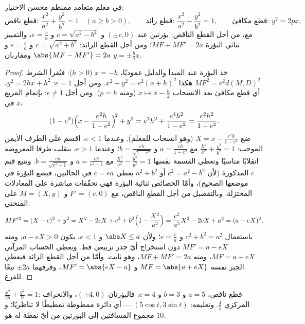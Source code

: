 \begin{theorem}\label{thm:b1:curves:reduced}
في معلم متعامد ممنظم محسن الاختيار:
\[
\text{قطع ناقص: } \frac{x^2}{a^2} + \frac{y^2}{b^2} = 1
\quad (a \geq b > 0),
\qquad
\text{قطع زائد: } \frac{x^2}{a^2} - \frac{y^2}{b^2} = 1,
\qquad
\text{قطع مكافئ: } y^2 = 2px,
\]
مع، من أجل القطع الناقص: بؤرتين عند $(\pm c, 0)$ و $c = \sqrt{a^2 - b^2}$ و
$e = \frac ca$، والتمييز ثنائي البؤرة $MF + MF' = 2a$؛
ومن أجل القطع الزائد: $c = \sqrt{a^2 + b^2}$ و $e = \frac ca$ و
$\abs{MF - MF'} = 2a$ ومقاربان $y = \pm\frac ba x$.
\end{theorem}

\begin{proof}
خذ البؤرة عند المبدأ والدليل عموديًا، $x = -h$
($h > 0$): فيُقرأ الشرط $MF^2 = e^2 d(M, D)^2$ هكذا $x^2 + y^2 =
e^2 (x + h)^2$. ومن أجل $e = 1$: $y^2 = 2hx + h^2$، أي قطع مكافئ بعد
الانسحاب $x \mapsto x - \frac h2$ (ومنه $p = h$). ومن أجل $e \neq 1$:
بإتمام المربع في $x$،
\[
(1 - e^2)\Bigl(x - \frac{e^2 h}{1 - e^2}\Bigr)^{\!2} + y^2
= e^2h^2 + \frac{e^4 h^2}{1 - e^2}
= \frac{e^2 h^2}{1 - e^2} .
\]
ضع $X = x - \frac{e^2h}{1-e^2}$ (وهو انسحاب للمعلم). وعندما $e < 1$،
اقسم على الطرف الأيمن الموجب:
$\frac{X^2}{a^2} + \frac{y^2}{b^2} = 1$ مع $a = \frac{eh}{1 -
e^2}$ و $b = \frac{eh}{\sqrt{1-e^2}}$؛ وعندما $e > 1$، ينقلب طرفا
المعروضة انقلابًا مناسبًا وتعطي القسمة نفسها
$\frac{X^2}{a^2} - \frac{y^2}{b^2} = 1$ مع $a = \frac{eh}{e^2 -
1}$ و $b = \frac{eh}{\sqrt{e^2 - 1}}$. وتتبع قيم $c$ المذكورة
(لأن $c^2 = a^2 - b^2$ أو $a^2 + b^2$ يعطي $c = ea$ في
الحالتين، فيضع البؤرة في موضعها الصحيح)، وأمّا الخصائص ثنائية البؤرة فهي
تحقّقات مباشرة على المعادلات المختزلة. وبالتفصيل من أجل
القطع الناقص، مع $F' = (c, 0)$ و $M = (X, y)$ على المنحني:
\[
MF'^2 = (X - c)^2 + y^2
= X^2 - 2cX + c^2 + b^2\Bigl(1 - \frac{X^2}{a^2}\Bigr)
= \frac{c^2}{a^2}X^2 - 2cX + a^2
= (a - eX)^2 ,
\]
باستعمال $c^2 + b^2 = a^2$ و $e = \frac ca$؛ ولأن $\abs X \leq
a$ و $e < 1$، يكون $a - eX > 0$، ومنه $MF' = a - eX$ دون استخراج أيّ جذر
تربيعي قط. ويعطي الحساب المرآتي $MF = a + eX$،
ومنه $MF + MF' = 2a$، وهو ثابت. وأمّا من أجل القطع الزائد فيعطي الجبر
نفسه $MF = \abs{a + eX}$ و $MF' = \abs{eX - a}$،
وفرقهما $\pm2a$ تبعًا للفرع.
\end{proof}

\begin{example}\label{ex:b1:curves:conicexample}
$\frac{x^2}{25} + \frac{y^2}{9} = 1$: قطع ناقص، $a = 5$ و $b = 3$ و $c
= 4$: فالبؤرتان $(\pm4, 0)$، والانحراف المركزي $\frac45$. وتعليمه:
$(5\cos t, 3\sin t)$ --- أي دائرة ممطوطة تمطيطًا لا تناظريًا؛ و
مجموع المسافتين إلى البؤرتين من أيّ نقطة له هو $10$.
\end{example}

